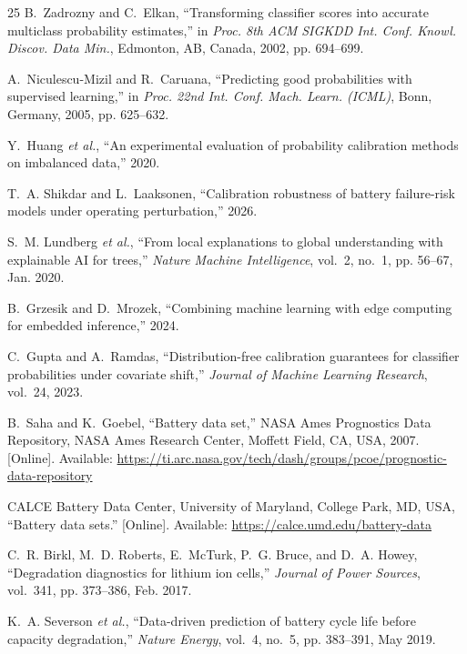 \begin{thebibliography}{25}
B.~Zadrozny and C.~Elkan, ``Transforming classifier scores into accurate multiclass probability estimates,'' in \emph{Proc. 8th ACM SIGKDD Int. Conf. Knowl. Discov. Data Min.}, Edmonton, AB, Canada, 2002, pp. 694--699.

A.~Niculescu-Mizil and R.~Caruana, ``Predicting good probabilities with supervised learning,'' in \emph{Proc. 22nd Int. Conf. Mach. Learn. (ICML)}, Bonn, Germany, 2005, pp. 625--632.

Y.~Huang \emph{et al.}, ``An experimental evaluation of probability calibration methods on imbalanced data,'' 2020.

T.~A. Shikdar and L.~Laaksonen, ``Calibration robustness of battery failure-risk models under operating perturbation,'' 2026.

S.~M. Lundberg \emph{et al.}, ``From local explanations to global understanding with explainable AI for trees,'' \emph{Nature Machine Intelligence}, vol.~2, no.~1, pp. 56--67, Jan. 2020.

B.~Grzesik and D.~Mrozek, ``Combining machine learning with edge computing for embedded inference,'' 2024.

C.~Gupta and A.~Ramdas, ``Distribution-free calibration guarantees for classifier probabilities under covariate shift,'' \emph{Journal of Machine Learning Research}, vol.~24, 2023.

B.~Saha and K.~Goebel, ``Battery data set,'' NASA Ames Prognostics Data Repository, NASA Ames Research Center, Moffett Field, CA, USA, 2007. [Online]. Available: \url{https://ti.arc.nasa.gov/tech/dash/groups/pcoe/prognostic-data-repository}

CALCE Battery Data Center, University of Maryland, College Park, MD, USA, ``Battery data sets.'' [Online]. Available: \url{https://calce.umd.edu/battery-data}

C.~R. Birkl, M.~D. Roberts, E.~McTurk, P.~G. Bruce, and D.~A. Howey, ``Degradation diagnostics for lithium ion cells,'' \emph{Journal of Power Sources}, vol.~341, pp. 373--386, Feb. 2017.

K.~A. Severson \emph{et al.}, ``Data-driven prediction of battery cycle life before capacity degradation,'' \emph{Nature Energy}, vol.~4, no.~5, pp. 383--391, May 2019.


\end{thebibliography}
